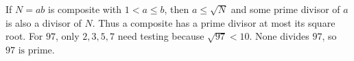 If $N=ab$ is composite with $1<a\le b$, then $a\le\sqrt N$ and some prime divisor of $a$ is also a divisor of $N$. Thus a composite has a prime divisor at most its square root. For $97$, only $2,3,5,7$ need testing because $\sqrt{97}<10$. None divides $97$, so $\boxed{97\text{ is prime}}$.
